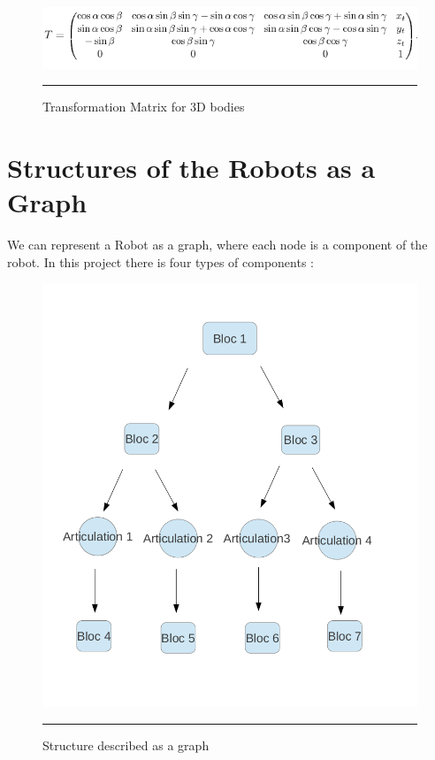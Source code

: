 \begin{figure}[htbp]
    \centering
    \includegraphics[scale=0.5]{Figures/transform_matrix.png}
    \rule{35em}{0.5pt}
    \caption[Transformation Matrix for 3D bodies]{Transformation Matrix for 3D bodies}
    \label{fig:transform_matrix}
\end{figure}


\pagebreak
\section{Structures of the Robots as a Graph} 

We can represent a Robot as a graph, where each node is a component of the robot. In this project there is four types of components : 


\begin{figure}[htbp]
    \centering
    \includegraphics[scale=0.5]{Figures/schema_arbre.png}
    \rule{35em}{0.5pt}
    \caption[Structure described as graph]{Structure described as a graph}
    \label{fig:TreeStruct}
\end{figure}



